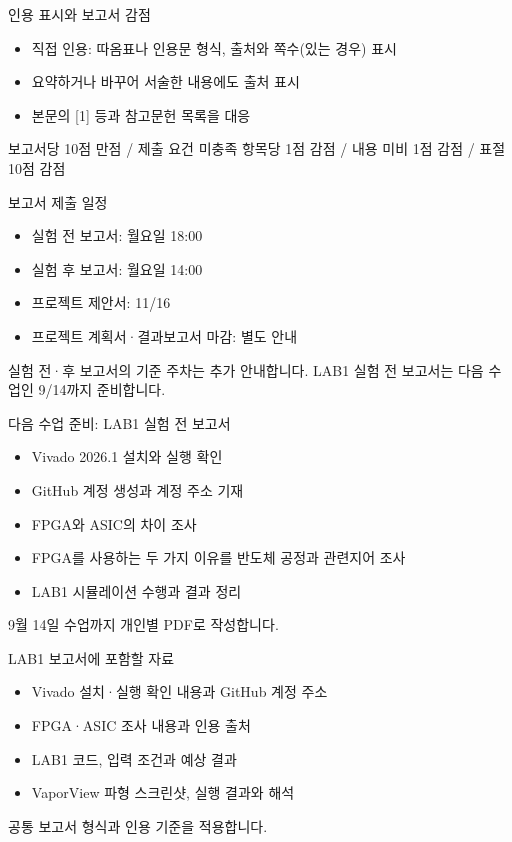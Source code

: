 \documentclass[aspectratio=169,11pt,t]{beamer}
\begin{document}
\begin{frame}{인용 표시와 보고서 감점}
\begin{itemize}
\item 직접 인용: 따옴표나 인용문 형식, 출처와 쪽수(있는 경우) 표시
\item 요약하거나 바꾸어 서술한 내용에도 출처 표시
\item 본문의 [1] 등과 참고문헌 목록을 대응
\end{itemize}
\vspace{0.35cm}
보고서당 10점 만점 / 제출 요건 미충족 항목당 1점 감점 / 내용 미비 1점 감점 / 표절 10점 감점
\end{frame}

\begin{frame}{보고서 제출 일정}
\begin{itemize}
\item 실험 전 보고서: 월요일 18:00
\item 실험 후 보고서: 월요일 14:00
\item 프로젝트 제안서: 11/16
\item 프로젝트 계획서·결과보고서 마감: 별도 안내
\end{itemize}
\vspace{0.35cm}
실험 전·후 보고서의 기준 주차는 추가 안내합니다. LAB1 실험 전 보고서는 다음 수업인 9/14까지 준비합니다.
\end{frame}

\begin{frame}{다음 수업 준비: LAB1 실험 전 보고서}
\begin{itemize}
\item Vivado 2026.1 설치와 실행 확인
\item GitHub 계정 생성과 계정 주소 기재
\item FPGA와 ASIC의 차이 조사
\item FPGA를 사용하는 두 가지 이유를 반도체 공정과 관련지어 조사
\item LAB1 시뮬레이션 수행과 결과 정리
\end{itemize}
\vspace{0.35cm}
9월 14일 수업까지 개인별 PDF로 작성합니다.
\end{frame}

\begin{frame}{LAB1 보고서에 포함할 자료}
\begin{itemize}
\item Vivado 설치·실행 확인 내용과 GitHub 계정 주소
\item FPGA·ASIC 조사 내용과 인용 출처
\item LAB1 코드, 입력 조건과 예상 결과
\item VaporView 파형 스크린샷, 실행 결과와 해석
\end{itemize}
\vspace{0.35cm}
공통 보고서 형식과 인용 기준을 적용합니다.
\end{frame}
\end{document}
